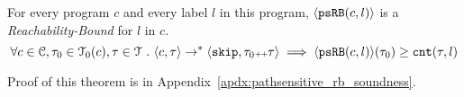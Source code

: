 \begin{thm}
    \label{thm:pathsensitive_rb_soundness}
  For every program ${c}$ and every label $l$ in this program,
  $\langle \mathtt{psRB}(c, l) \rangle$ is a \emph{Reachability-Bound} for $l$ in $c$.
  \[
    \forall c \in \mathcal{C}, \mathtt{\tau}_0 \in \mathcal{T}_0(c), \mathtt{\tau} \in \mathcal{T} ~.~ 
    \langle {c}, \mathtt{\tau} \rangle \to^{*} \langle \mathtt{skip}, \mathtt{\tau}_0 {\scriptscriptstyle ++} \mathtt{\tau} \rangle 
    \implies \langle \mathtt{psRB}(c, l) \rangle(\mathtt{\tau}_0) \geq \mathtt{cnt}(\mathtt{\tau}, l) 
    \]
  \end{thm}
Proof of this theorem is in Appendix~\ref{apdx:pathsensitive_rb_soundness}.

